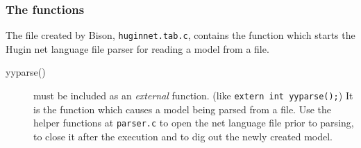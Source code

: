 \documentclass[12pt,a4paper]{report}
\newcommand{\examplecode}[1]{\texttt{#1}}
\newcommand{\cfilename}[1]{\texttt{#1}}
\begin{document}
\subsubsection{The functions}
The file created by Bison, \cfilename{huginnet.tab.c}, contains the
function which starts the Hugin net language file parser for reading a model
from a file.
\begin{description}
\item[yyparse()] must be included as an {\it external} function. 
(like \examplecode{extern int yyparse();}) It is the function which 
causes a model being parsed from a file. Use the helper functions at 
\cfilename{parser.c} to open the net language file prior to parsing, 
to close it after the execution and to dig out the newly created model.
\end{description}
\end{document}
